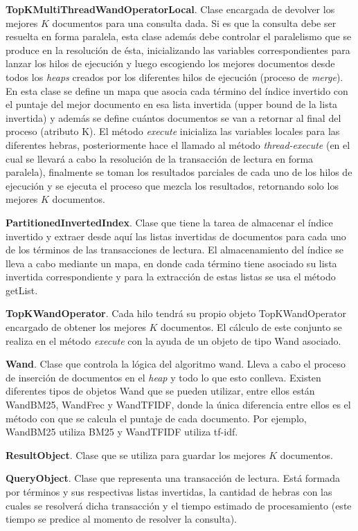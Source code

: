 \begin{list}{}{}
	\item \textbf{TopKMultiThreadWandOperatorLocal}. Clase encargada de devolver los mejores $K$ documentos para una consulta dada. Si es que la consulta debe ser resuelta en forma paralela, esta clase además debe controlar el paralelismo que se produce en la resolución de ésta, inicializando las variables correspondientes para lanzar los hilos de ejecución y luego escogiendo los mejores documentos desde todos los \textit{heaps} creados por los diferentes hilos de ejecución (proceso de \textit{merge}). En esta clase se define un mapa que asocia cada término del índice invertido con el puntaje del mejor documento en esa lista invertida (upper bound de la lista invertida) y además se define cuántos documentos se van a retornar al final del proceso (atributo K). El método \textit{execute} inicializa las variables locales para las diferentes hebras, posteriormente hace el llamado al método \emph{thread-execute} (en el cual se llevará a cabo la resolución de la transacción de lectura en forma paralela), finalmente se toman los resultados parciales de cada uno de los hilos de ejecución y se ejecuta el proceso que mezcla los resultados, retornando solo los mejores $K$ documentos. 
	
	\item \textbf{PartitionedInvertedIndex}. Clase que tiene la tarea de almacenar el índice invertido y extraer desde aquí las listas invertidas de documentos para cada uno de los términos de las transacciones de lectura. El almacenamiento del índice se lleva a cabo mediante un mapa, en donde cada término tiene asociado su lista invertida correspondiente y para la extracción de estas listas se usa el método getList.
	
	\item \textbf{TopKWandOperator}.  Cada hilo tendrá su propio objeto TopKWandOperator encargado de obtener los mejores $K$ documentos. El cálculo de este conjunto se realiza en el método \textit{execute} con la ayuda de un objeto de tipo Wand asociado.
	
	\item \textbf{Wand}. Clase que controla la lógica del algoritmo wand. Lleva a cabo el proceso de inserción de documentos en el \textit{heap} y todo lo que esto conlleva. Existen diferentes tipos de objetos Wand que se pueden utilizar, entre ellos están WandBM25, WandFrec y WandTFIDF, donde la única diferencia entre ellos es el método con que se calcula el puntaje de cada documento. Por ejemplo, WandBM25 utiliza BM25 y WandTFIDF utiliza tf-idf. 
	
	\item \textbf{ResultObject}. Clase que se utiliza para guardar los mejores $K$ documentos.
	
	\item \textbf{QueryObject}. Clase que representa una transacción de lectura. Está formada por términos y sus respectivas listas invertidas, la cantidad de hebras con las cuales se resolverá dicha transacción y el tiempo estimado de procesamiento (este tiempo se predice al momento de resolver la consulta).

\end{list}


